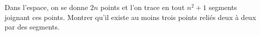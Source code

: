 Dans l'espace, on se donne $2n$ points et l'on trace en tout $n^2 + 1$ segments joignant ces points. Montrer qu'il existe au moins trois points reliés deux à deux par des segments.
